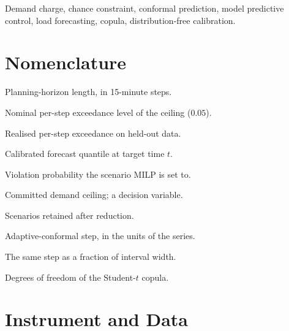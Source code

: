 \documentclass[journal]{IEEEtran}
\begin{document}
\begin{IEEEkeywords}
Demand charge, chance constraint, conformal prediction, model predictive
control, load forecasting, copula, distribution-free calibration.
\end{IEEEkeywords}

\section*{Nomenclature}
\begin{IEEEdescription}
\item[$H$] Planning-horizon length, in 15-minute steps.
\item[$\alpha$] Nominal per-step exceedance level of the ceiling ($0.05$).
\item[$\hat\alpha$] Realised per-step exceedance on held-out data.
\item[$\hat q_{\alpha}(t)$] Calibrated forecast quantile at target time $t$.
\item[$\varepsilon$] Violation probability the scenario MILP is set to.
\item[$D_{\mathrm{peak}}$] Committed demand ceiling; a decision variable.
\item[$S$] Scenarios retained after reduction.
\item[$\gamma$] Adaptive-conformal step, in the units of the series.
\item[$\kappa$] The same step as a fraction of interval width.
\item[$\nu$] Degrees of freedom of the Student-$t$ copula.
\end{IEEEdescription}




\section{Instrument and Data}
\label{sec:setup}
{\let\section\subsection
 
 }






\end{document}
